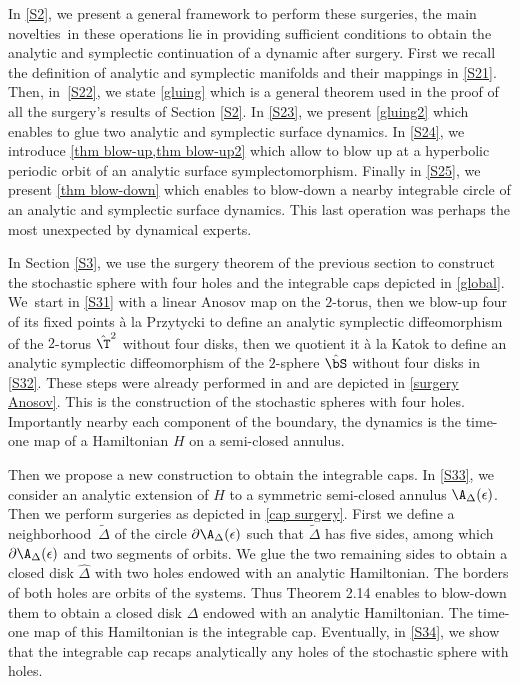 In \cref{S2}, we present a general framework to perform these surgeries, the main novelties~in these operations lie in providing sufficient conditions to obtain the analytic and symplectic continuation of a dynamic after surgery. First we recall the definition of analytic and symplectic manifolds and their mappings in \cref{S21}. Then, in~\cref{S22}, we state \cref{gluing} which is a general theorem used in the proof of all the surgery's results of Section \ref{S2}. In \cref{S23}, we present \cref{gluing2} which enables to glue two analytic and symplectic surface dynamics. In \cref{S24}, we introduce \cref{thm blow-up,thm blow-up2} which allow to blow up at a hyperbolic periodic orbit of an analytic surface symplectomorphism. Finally in \cref{S25}, we present \cref{thm blow-down} which enables to blow-down a nearby integrable circle of an analytic and symplectic surface dynamics. This last operation was perhaps the most unexpected by dynamical experts.

In Section \ref{S3}, we use the surgery theorem of the previous section to construct the stochastic sphere with four holes and the integrable caps depicted in \cref{global}. We~start in \cref{S31} with a linear Anosov map on the $2$-torus, then we blow-up four of its fixed points à la Przytycki to define an analytic symplectic diffeomorphism of the $2$-torus $\hat \T^2$ without four disks, then we quotient it à la Katok to define an analytic symplectic diffeomorphism of the $2$-sphere $\hat \bS$ without four disks in \cref{S32}. These steps were already performed in \cite{BT19} and are depicted in \cref{surgery Anosov}. This is the construction of the stochastic spheres with four holes. Importantly nearby each component of the boundary, the dynamics is the time-one map of a Hamiltonian $H$ on a semi-closed annulus.

Then we propose a new construction to obtain the integrable caps. In \cref{S33}, we consider an analytic extension of $H$ to a symmetric semi-closed annulus $\A_\Delta (\epsilon)$. Then we perform surgeries as depicted in \cref{cap surgery}. First we define a neighborhood~$\tilde \Delta$ of the circle $\partial \A_\Delta (\epsilon)$ such that $\tilde \Delta$ has five sides, among which $\partial \A_\Delta (\epsilon)$ and two segments of orbits. We glue the two remaining sides to obtain a closed disk $\widehat \Delta$ with two holes endowed with an analytic Hamiltonian. The borders of both holes are orbits of the systems. Thus Theorem 2.14 enables to blow-down them to obtain a closed disk $\Delta$ endowed with an analytic Hamiltonian. The time-one map of this Hamiltonian is the integrable cap. Eventually, in \cref{S34}, we show that the integrable cap recaps analytically any holes of the stochastic sphere with holes.

